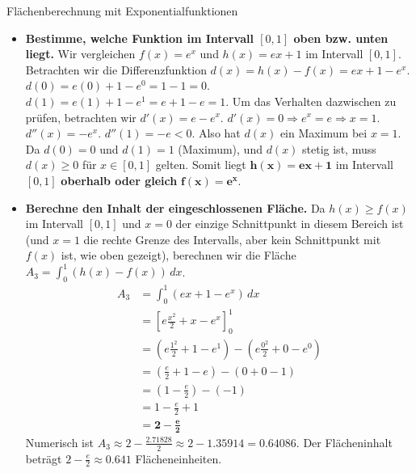 \begin{loesungsumgebung}{Flächenberechnung mit Exponentialfunktionen}
\begin{enumerate}[label=(\alph*)]
\begin{itemize}
        \item \textbf{Bestimme, welche Funktion im Intervall $[0,1]$ oben bzw. unten liegt.}
        Wir vergleichen $f(x)=e^x$ und $h(x)=ex+1$ im Intervall $[0,1]$.
        Betrachten wir die Differenzfunktion $d(x) = h(x) - f(x) = ex+1 - e^x$.
        $d(0) = e(0)+1 - e^0 = 1-1 = 0$.
        $d(1) = e(1)+1 - e^1 = e+1-e = 1$.
        Um das Verhalten dazwischen zu prüfen, betrachten wir $d'(x) = e - e^x$.
        $d'(x)=0 \Rightarrow e^x=e \Rightarrow x=1$.
        $d''(x) = -e^x$. $d''(1) = -e < 0$. Also hat $d(x)$ ein Maximum bei $x=1$.
        Da $d(0)=0$ und $d(1)=1$ (Maximum), und $d(x)$ stetig ist, muss $d(x) \ge 0$ für $x \in [0,1]$ gelten.
        Somit liegt $\mathbf{h(x) = ex+1}$ im Intervall $[0,1]$ \textbf{oberhalb oder gleich} $\mathbf{f(x) = e^x}$.

        \item \textbf{Berechne den Inhalt der eingeschlossenen Fläche.}
        Da $h(x) \ge f(x)$ im Intervall $[0,1]$ und $x=0$ der einzige Schnittpunkt in diesem Bereich ist (und $x=1$ die rechte Grenze des Intervalls, aber kein Schnittpunkt mit $f(x)$ ist, wie oben gezeigt), berechnen wir die Fläche $A_3 = \int_0^1 (h(x)-f(x)) \,dx$.
        \begin{align*}
        A_3 &= \int_0^1 (ex+1 - e^x) \,dx \\
            &= \left[ e\frac{x^2}{2} + x - e^x \right]_0^1 \\
            &= \left( e\frac{1^2}{2} + 1 - e^1 \right) - \left( e\frac{0^2}{2} + 0 - e^0 \right) \\
            &= \left( \frac{e}{2} + 1 - e \right) - (0 + 0 - 1) \\
            &= \left( 1 - \frac{e}{2} \right) - (-1) \\
            &= 1 - \frac{e}{2} + 1 \\
            &= \mathbf{2 - \frac{e}{2}}
        \end{align*}
        Numerisch ist $A_3 \approx 2 - \frac{2.71828}{2} \approx 2 - 1.35914 = 0.64086$.
        Der Flächeninhalt beträgt $2 - \frac{e}{2} \approx 0.641$ Flächeneinheiten.
    \end{itemize}
\end{enumerate}

\end{loesungsumgebung}



